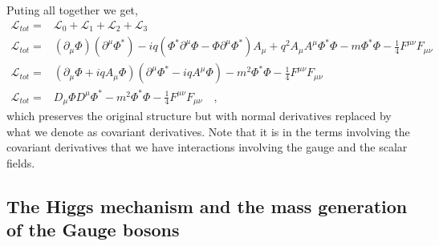 \documentclass[12pt]{article}
\begin{document}
Puting all together we get,
%
 \begin{align} 
  \mathcal{L}_{tot}= & \mathcal{L}_0+\mathcal{L}_1+\mathcal{L}_2+\mathcal{L}_3 \nonumber \\
  \mathcal{L}_{tot}= & (\partial_\mu \Phi)(\partial^\mu \Phi^*) - iq(\Phi^* \partial^\mu \Phi - \Phi \partial^\mu \Phi^* )A_\mu + q^2 A_\mu A^\mu \Phi^* \Phi - m \Phi^* \Phi - \frac{1}{4} F^{\mu \nu} F_{\mu \nu} \nonumber \\ 
  \mathcal{L}_{tot}= & (\partial_\mu \Phi + iq A_\mu \Phi)(\partial^\mu \Phi^* - iq A^\mu \Phi)- m^2 \Phi^* \Phi  - \frac{1}{4} F^{\mu \nu} F_{\mu \nu} \nonumber \\
  \mathcal{L}_{tot}= & D_\mu \Phi D^\mu \Phi^*  - m^2 \Phi^* \Phi  - \frac{1}{4} F^{\mu \nu} F_{\mu \nu} \quad ,  \label{totgarbage}
 \end{align}
%
which preserves the original structure but with normal derivatives replaced by what we denote as covariant derivatives. Note that it is in the terms involving the covariant derivatives that we have interactions involving the gauge and the scalar fields.
 



\subsection{The Higgs mechanism and the mass generation of the Gauge bosons}


\end{document}
